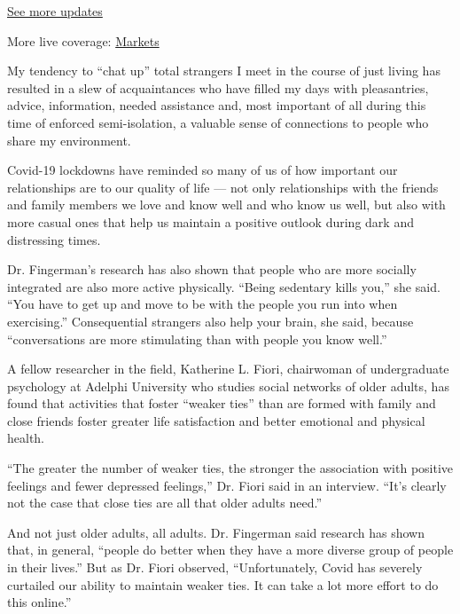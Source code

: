 \href{https://www.nytimes.com/2020/08/03/world/coronavirus-covid-19.html?action=click\&pgtype=Article\&state=default\&region=MAIN_CONTENT_1\&context=storylines_live_updates}{See
more updates}

More live coverage:
\href{https://www.nytimes.com/live/2020/08/03/business/stock-market-today-coronavirus?action=click\&pgtype=Article\&state=default\&region=MAIN_CONTENT_1\&context=storylines_live_updates}{Markets}

My tendency to ``chat up'' total strangers I meet in the course of just
living has resulted in a slew of acquaintances who have filled my days
with pleasantries, advice, information, needed assistance and, most
important of all during this time of enforced semi-isolation, a valuable
sense of connections to people who share my environment.

Covid-19 lockdowns have reminded so many of us of how important our
relationships are to our quality of life --- not only relationships with
the friends and family members we love and know well and who know us
well, but also with more casual ones that help us maintain a positive
outlook during dark and distressing times.

Dr. Fingerman's research has also shown that people who are more
socially integrated are also more active physically. ``Being sedentary
kills you,'' she said. ``You have to get up and move to be with the
people you run into when exercising.'' Consequential strangers also help
your brain, she said, because ``conversations are more stimulating than
with people you know well.''

A fellow researcher in the field, Katherine L. Fiori, chairwoman of
undergraduate psychology at Adelphi University who studies social
networks of older adults, has found that activities that foster ``weaker
ties'' than are formed with family and close friends foster greater life
satisfaction and better emotional and physical health.

``The greater the number of weaker ties, the stronger the association
with positive feelings and fewer depressed feelings,'' Dr. Fiori said in
an interview. ``It's clearly not the case that close ties are all that
older adults need.''

And not just older adults, all adults. Dr. Fingerman said research has
shown that, in general, ``people do better when they have a more diverse
group of people in their lives.'' But as Dr. Fiori observed,
``Unfortunately, Covid has severely curtailed our ability to maintain
weaker ties. It can take a lot more effort to do this online.''

